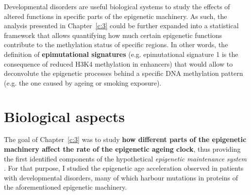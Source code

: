 \bigskip

Developmental disorders are useful biological systems to study the effects of altered functions in specific parts of the epigenetic machinery. As such, the analysis presented in Chapter~\ref{c:3} could be further expanded into a statistical framework that allows quantifying how much certain epigenetic functions contribute to the methylation status of specific regions. In other words, the definition of \textbf{epimutational signatures} (e.g. epimutational signature 1 is the consequence of reduced H3K4 methylation in enhancers) that would allow to deconvolute the epigenetic processes behind a specific DNA methylation pattern (e.g. the one caused by ageing or smoking exposure).

\smallskip

\section{Biological aspects}

\smallskip

The goal of Chapter~\ref{c:3} was to study \textbf{how different parts of the epigenetic machinery affect the rate of the epigenetic ageing clock}, thus providing the first identified components of the hypothetical \textit{epigenetic maintenance system} \cite{Horvath2013}. For that purpose, I studied the epigenetic age acceleration observed in patients with developmental disorders, many of which harbour mutations in proteins of the aforementioned epigenetic machinery.

\bigskip

